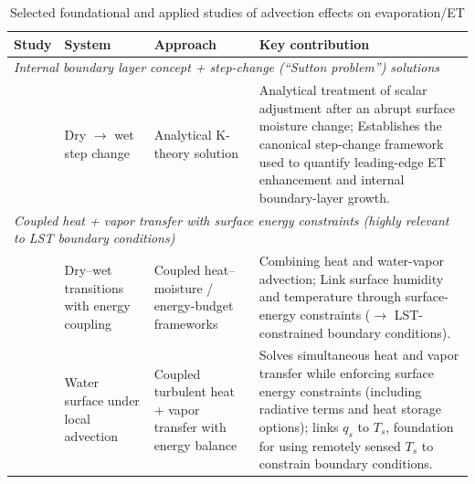 \documentclass{article}
\begin{document}
    
    
    
    
    \begin{table}[htbp]
    \centering
    \caption{Selected foundational and applied studies of advection effects on evaporation/ET}
    \renewcommand{\arraystretch}{1.15}
    \label{tab:advection_edge_links}
    \begin{tabular}{|p{2.7cm}|p{3.2cm}|p{2.9cm}|p{6.0cm}|}
    \label{tab:advection_studies_brutsaert}\\
    \hline
    \textbf{Study} & \textbf{System } & \textbf{Approach} & \textbf{Key contribution} \\
    \hline
    \multicolumn{4}{|l|}{\textit{Internal boundary layer concept + step-change (``Sutton problem'') solutions}} \\
    \hline
    \citet{sutton1934wind} & Dry $\rightarrow$ wet step change & Analytical K-theory solution & Analytical treatment of scalar adjustment after an abrupt surface moisture change; 
    Establishes the canonical step-change framework used to quantify leading-edge ET enhancement and internal boundary-layer growth. \\
    \hline

    \multicolumn{4}{|l|}{\textit{Coupled heat + vapor transfer with surface energy constraints (highly relevant to LST boundary conditions)}} \\
    \hline
    \citet{timofeev1954change} \citet{de1959influence} & Dry--wet transitions with energy coupling 
    & 
    Coupled heat--moisture / energy-budget frameworks &  Combining heat and water-vapor advection; 
    Link surface humidity and temperature through surface-energy constraints ($\rightarrow$ LST-constrained boundary conditions). 
    \\
    \hline
    \citet{yeh1971solution} & Water surface under local advection & Coupled turbulent heat + vapor transfer with energy balance & Solves simultaneous heat and vapor transfer while enforcing surface energy constraints (including radiative terms and heat storage options);  links $q_s$ to $T_s$, foundation for using remotely sensed $T_s$ to constrain boundary conditions. \\
    \hline


\end{tabular}
\end{table}
\end{document}

